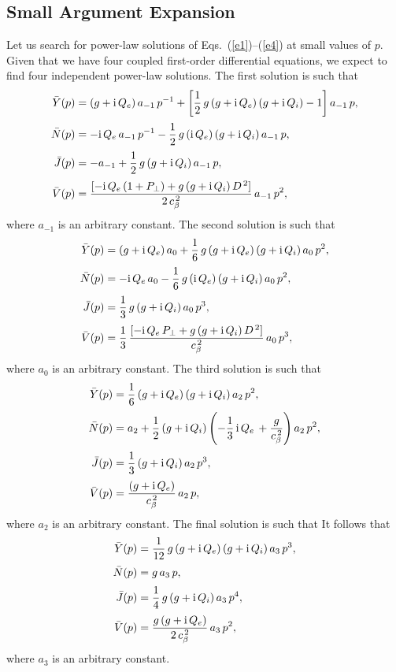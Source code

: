 \documentclass[12pt,prb,aps]{revtex4-1}
\begin{document}
\subsection{Small Argument Expansion}
Let us search for power-law solutions of Eqs.~(\ref{e1})--(\ref{e4}) at small values of $p$. Given that we have four coupled first-order differential equations,
we expect to find four independent power-law solutions.
The first solution is
such that
\begin{align}
\bar{Y}(p) &= (g+{\rm i}\,Q_e)\,a_{-1}\,p^{-1} + \left[\frac{1}{2}\,g\,(g+{\rm i}\,Q_e)\,(g+{\rm i}\,Q_i) - 1\right]a_{-1}\,p,\\[0.5ex]
\bar{N}(p)&= -{\rm i}\,Q_e\,a_{-1}\, p^{-1} - \frac{1}{2}\,g\,({\rm i}\,Q_e)\,(g+{\rm i}\,Q_i)\,a_{-1}\,p,\\[0.5ex]
\bar{J}(p)&= -a_{-1}+ \frac{1}{2}\,g\,(g+{\rm i}\,Q_i)\,a_{-1}\,p,\\[0.5ex]
\bar{V}(p)&= \frac{[-{\rm i}\,Q_e\,(1+P_\perp) + g\,(g+{\rm i}\,Q_i)\,D^{\,2}]}{2\,c_\beta^{\,2}}\,a_{-1}\,p^2,
\end{align}
where $a_{-1}$ is an arbitrary constant. 
The second solution is such that
\begin{align}
\bar{Y}(p) &= (g+{\rm i}\,Q_e)\,a_0+\frac{1}{6}\,g\,(g+{\rm i}\,Q_e)\,(g+{\rm i}\,Q_i)\,a_0\,p^2,\\[0.5ex]
\bar{N}(p) &= -{\rm i}\,Q_e\,a_0-\frac{1}{6}\,g\,({\rm i}\,Q_e)\,(g+{\rm i}\,Q_i)\,a_0\,p^2,\\[0.5ex]
\bar{J}(p)&= \frac{1}{3}\,g\,(g+{\rm i}\,Q_i)\,a_0\,p^3,\\[0.5ex]
\bar{V}(p)&= \frac{1}{3}\,\frac{[-{\rm i}\,Q_e\,P_\perp + g\,(g+{\rm i }\,Q_i)\,D^{\,2}]}{c_\beta^{\,2}}\,a_0\,p^3,
\end{align}
where $a_0$ is an arbitrary constant. 
The third solution is such that
\begin{align}
\bar{Y}(p) &= \frac{1}{6}\,(g+{\rm i}\,Q_e)\,(g+{\rm i}\,Q_i)\,a_2\,p^2,\\[0.5ex]
\bar{N}(p) &= a_2+\frac{1}{2}\,(g+{\rm i}\,Q_i)\left(-\frac{1}{3}\,{\rm i}\,Q_e\,+ \frac{g}{c_\beta^{\,2}}\right)a_2\,p^2,\\[0.5ex]
\bar{J}(p) &=\frac{1}{3}\,(g+{\rm i}\,Q_i)\,a_2\,p^3,\\[0.5ex]
\bar{V}(p) &=\frac{(g+{\rm i}\,Q_e)}{c_\beta^{\,2}}\,a_2\,p,
\end{align}
where $a_2$ is an arbitrary constant. 
The final solution is such that
It follows that 
\begin{align}
\bar{Y}(p)& = \frac{1}{12}\,g\,(g+{\rm i}\,Q_e)\,(g+{\rm i}\,Q_i)\,a_3\,p^3,\\[0.5ex]
\bar{N}(p) &= g\,a_3\,p,\\[0.5ex]
\bar{J}(p)&= \frac{1}{4}\,g\,(g+{\rm i}\,Q_i)\,a_3\,p^4,\\[0.5ex]
\bar{V}(p) &= \frac{g\,(g+{\rm i}\,Q_e)}{2\,c_\beta^{\,2}}\,a_3\,p^2,
\end{align}
where $a_3$ is an arbitrary constant. 
\end{document}

